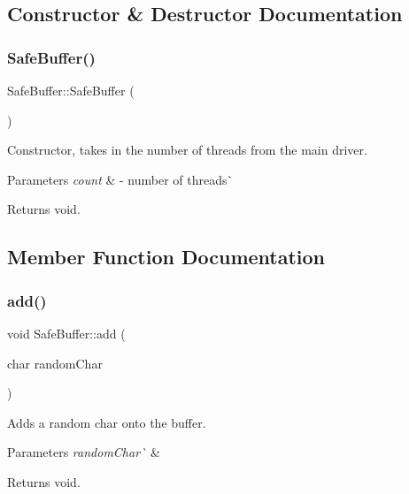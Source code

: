 \subsection{Constructor \& Destructor Documentation}
\mbox{\label{class_safe_buffer_af835d8d08c4dcd3326f21ae2e9988699}} 
\subsubsection{\texorpdfstring{Safe\+Buffer()}{SafeBuffer()}}
{\footnotesize\ttfamily Safe\+Buffer\+::\+Safe\+Buffer (\begin{DoxyParamCaption}{ }\end{DoxyParamCaption})}



Constructor, takes in the number of threads from the main driver. 


\begin{DoxyParams}{Parameters}
{\em count} & -\/ number of threads\`{} \\
\hline
\end{DoxyParams}
\begin{DoxyReturn}{Returns}
void. 
\end{DoxyReturn}


\subsection{Member Function Documentation}
\mbox{\label{class_safe_buffer_a4181b91d780945dd6a8ccd4d9a8b5345}} 
\subsubsection{\texorpdfstring{add()}{add()}}
{\footnotesize\ttfamily void Safe\+Buffer\+::add (\begin{DoxyParamCaption}\item[{char}]{random\+Char }\end{DoxyParamCaption})}



Adds a random char onto the buffer. 


\begin{DoxyParams}{Parameters}
{\em random\+Char\`{}} & \\
\hline
\end{DoxyParams}
\begin{DoxyReturn}{Returns}
void. 
\end{DoxyReturn}
\mbox{\label{class_safe_buffer_a164e4756c5e2f1ed4940e08f37366c9f}} 
